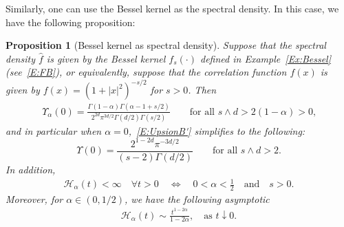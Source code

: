 \documentclass[a4paper,11pt]{article}%
\theoremstyle{plain}
\newtheorem{proposition}[theorem]{Proposition}
\theoremstyle{definition}
\numberwithin{equation}{section}
\begin{document}
Similarly, one can use the Bessel kernel as the spectral density. In this case, we have the
following proposition:

\begin{proposition}[Bessel kernel as spectral density]\label{P:Bessel'}
  Suppose that the spectral density $\widehat{f}$ is given by the Bessel kernel $f_s(\cdot)$ defined
  in Example~\ref{Ex:Bessel} (see~\eqref{E:FB}), or equivalently, suppose that the correlation
  function $f(x)$ is given by $f(x) = \left(1+|x|^2\right)^{-s/2}$ for $s>0$. Then
  \begin{align}\label{E:UpsionB'}
    \Upsilon_{\alpha}(0)
    = \frac{\Gamma\left(1 - \alpha\right) \Gamma\left(\alpha - 1 + s/2\right)}{2^{2d} \pi^{3d/2} \Gamma(d/2)\Gamma\left(s/2\right) }
    \qquad \text{for all $s\wedge d>2(1-\alpha)>0$,}
  \end{align}
   and in particular when $\alpha = 0$,~\eqref{E:UpsionB'} simplifies to the following:
  \begin{equation}\label{E:Upsilon_0'}
     \Upsilon(0) = \frac{2^{1-2 d}\pi^{-3d/2}}{(s-2)\Gamma\left(d/2\right)}
     \qquad \text{for all $s\wedge d>2$.}
  \end{equation}
  In addition,
  \begin{gather}\label{E:HaB'}
    \mathcal{H}_\alpha(t) <\infty \quad \forall t>0 \quad \Longleftrightarrow \quad
    0<\alpha<\frac{1}{2} \quad \text{and} \quad s>0.
  \end{gather}
 Moreover, for $\alpha\in(0,1/2)$, we have the following asymptotic
  \begin{align}\label{E:HaBS'}
    \mathcal{H}_\alpha(t) \sim \frac{t^{1-2\alpha}}{1-2\alpha}, \quad \text{as $t\downarrow 0.$}
  \end{align}
\end{proposition}
\end{document}
